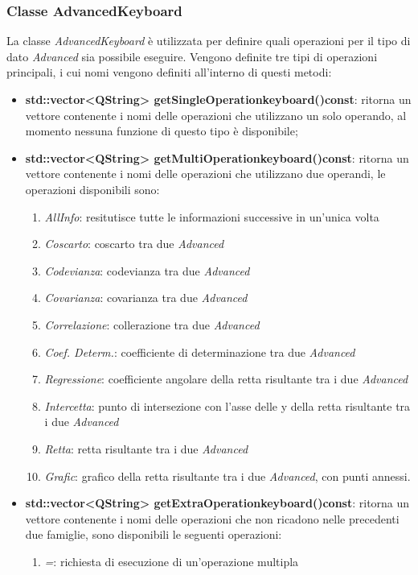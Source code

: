 \documentclass[a4paper,10pt]{article}
\begin{document}
    \subsubsection{Classe AdvancedKeyboard}
    La classe \textit{AdvancedKeyboard} è utilizzata per definire quali operazioni per il tipo di dato \textit{Advanced} sia possibile eseguire.
    Vengono definite tre tipi di operazioni principali, i cui nomi vengono definiti all'interno di questi metodi:
    \begin{itemize}
        \item \textbf{std::vector<QString> getSingleOperationkeyboard()const}: ritorna un vettore contenente i nomi delle operazioni che utilizzano un solo operando, al momento nessuna funzione di questo tipo è disponibile;
        \item \textbf{std::vector<QString> getMultiOperationkeyboard()const}: ritorna un vettore contenente i nomi delle operazioni che utilizzano due operandi, le operazioni disponibili sono:
        \begin{enumerate}
            \item \textit{AllInfo}: resitutisce tutte le informazioni successive in un'unica volta
            \item \textit{Coscarto}: coscarto tra due \textit{Advanced}
            \item \textit{Codevianza}: codevianza tra due \textit{Advanced}
            \item \textit{Covarianza}: covarianza tra due \textit{Advanced}
            \item \textit{Correlazione}: collerazione tra due \textit{Advanced}
            \item \textit{Coef. Determ.}: coefficiente di determinazione tra due \textit{Advanced}
            \item \textit{Regressione}: coefficiente angolare della retta risultante tra i due \textit{Advanced}
            \item \textit{Intercetta}: punto di intersezione con l'asse delle y della retta risultante tra i due \textit{Advanced}
            \item \textit{Retta}: retta risultante tra i due \textit{Advanced}
            \item \textit{Grafic}: grafico della retta risultante tra i due \textit{Advanced}, con punti annessi.
        \end{enumerate}
        \item \textbf{std::vector<QString> getExtraOperationkeyboard()const}: ritorna un vettore contenente i nomi delle operazioni che non ricadono nelle precedenti due famiglie, sono disponibili le seguenti operazioni:
        \begin{enumerate}
            \item \textit{=}: richiesta di esecuzione di un'operazione multipla
        \end{enumerate}
    \end{itemize}
    \newpage
\end{document}
